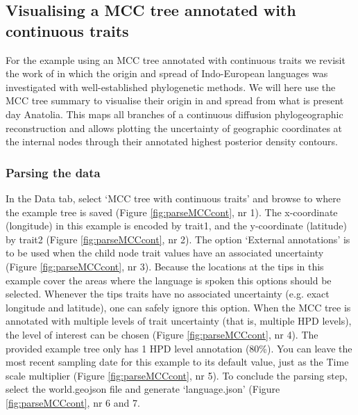\documentclass[english]{paper}
\begin{document}
\subsection{Visualising a MCC tree annotated with continuous traits}
\label{MCCcontinuous}

For the example using an MCC tree annotated with continuous traits we revisit the work of \citet{Bouckaert:2012aa} in which the origin and spread of Indo-European languages was investigated with well-established phylogenetic methods.
We will here use the MCC tree summary to visualise their origin in and spread from what is present day Anatolia. 
This maps all branches of a continuous diffusion phylogeographic reconstruction and allows plotting the uncertainty of geographic coordinates at the internal nodes through their annotated highest posterior density contours.

\subsubsection{Parsing the data}
\label{MCCcontParse}

In the Data tab, select `MCC tree with continuous traits' and browse to where the example tree is saved (Figure \ref{fig:parseMCCcont}, nr 1).
The x-coordinate (longitude) in this example is encoded by trait1, and the y-coordinate (latitude) by trait2 (Figure \ref{fig:parseMCCcont}, nr 2).
The option `External annotations' %
is to be used when the child node trait values have an associated uncertainty (Figure \ref{fig:parseMCCcont}, nr 3).
Because the locations at the tips in this example cover the areas where the language is spoken this options should be selected.
Whenever the tips traits have no associated uncertainty (e.g. exact longitude and latitude), one can safely ignore this option. 
When the MCC tree is annotated with multiple levels of trait uncertainty (that is, multiple HPD levels), the level of interest can be chosen (Figure \ref{fig:parseMCCcont}, nr 4).
The provided example tree only has 1 HPD level annotation (80\%).
You can leave the most recent sampling date for this example to its default value, just as the Time scale multiplier (Figure \ref{fig:parseMCCcont}, nr 5).
To conclude the parsing step, select the world.geojson file and generate `language.json' (Figure \ref{fig:parseMCCcont}, nr 6 and 7.
\end{document}

